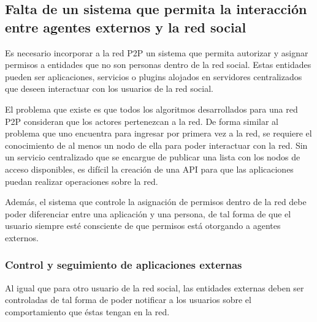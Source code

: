   \subsection{Falta de un sistema que permita la interacción entre agentes externos y la red social}
    
    Es necesario incorporar a la red P2P un sistema que permita autorizar y
    asignar permisos a entidades que no son personas dentro de la red social.
    Estas entidades pueden ser aplicaciones, servicios o plugins alojados en
    servidores centralizados que deseen interactuar con los usuarios de la red
    social.

    El problema que existe es que todos los algoritmos desarrollados para una
    red P2P consideran que los actores pertenezcan a la red. De forma
    similar al problema que uno encuentra para ingresar por primera vez a la red, se requiere el
    conocimiento de al menos un nodo de ella para poder interactuar con la red.
     Sin un servicio centralizado que se encargue de publicar una lista con los
    nodos de acceso disponibles, es difícil la creación de una API para que las
    aplicaciones puedan realizar operaciones sobre la red. 


    Además, el sistema que controle la asignación de permisos dentro de la red
    debe poder diferenciar entre una aplicación y una persona, de tal forma de
    que el usuario siempre esté consciente de que permisos está otorgando a agentes externos.
    
    \subsubsection{Control y seguimiento de aplicaciones externas}
    
    
    Al igual que para otro usuario de la red social, las entidades
    externas deben ser controladas de tal forma de poder notificar a los
    usuarios sobre el comportamiento que éstas tengan en la red.
    
